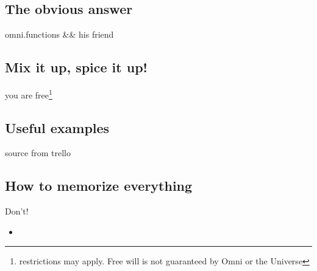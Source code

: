 \subsection{The obvious answer}
omni.functions \&\& his friend 
\subsection{Mix it up, spice it up!}
you are free\footnote{restrictions may apply. Free will is not guaranteed by Omni or the Universe}
\subsection{Useful examples}
source from trello
\subsection{How to memorize everything}
Don't!

\begin{itemize}
    \item
\end{itemize}
